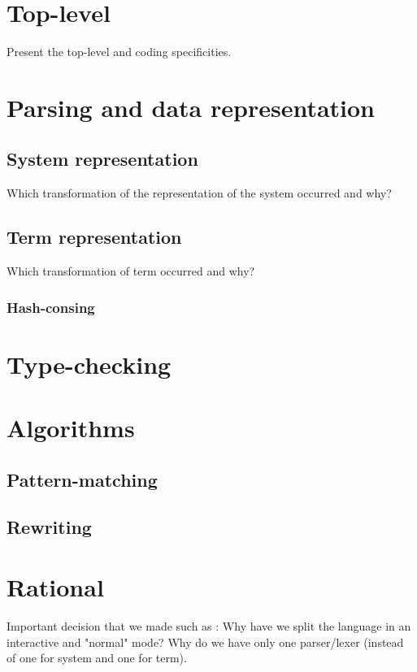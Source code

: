\documentclass[12pt,a4paper]{article}
\begin{document}
\section{Top-level}
\label{top-level}
Present the top-level and coding specificities.

\section{Parsing and data representation}
\label{data}

\subsection{System representation}
\label{data-system}
Which transformation of the representation of the system occurred and why?

\subsection{Term representation}
\label{data-term}
Which transformation of term occurred and why?

\subsubsection{Hash-consing}
\label{data-term-hash-consing}


\section{Type-checking}
\label{typechecking}

\section{Algorithms}
\label{algorithms}

\subsection{Pattern-matching}
\label{pattern-matching}

\subsection{Rewriting}
\label{rewriting}

\section{Rational}
\label{rational}
Important decision that we made such as : Why have we split the language in an interactive and "normal" mode? Why do we have only one parser/lexer (instead of one for system and one for term).
\end{document}
